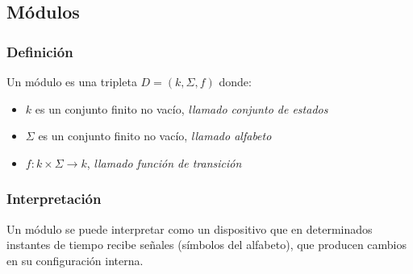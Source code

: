 \subsection{Módulos}
\subsubsection*{Definición}
Un módulo es una tripleta $D=(k,\Sigma,f)$ donde:
\begin{itemize}
\item $k$ es un conjunto finito no vacío, \textit{llamado conjunto de estados}
\item $\Sigma$ es un conjunto finito no vacío, \textit{llamado alfabeto}
\item $f:k\times\Sigma\rightarrow k$, \textit{llamado función de transición}
\end{itemize}
\subsubsection*{Interpretación}
Un módulo se puede interpretar como un dispositivo que en determinados instantes de tiempo recibe señales (símbolos del alfabeto), que producen cambios en su configuración interna.
\begin{center}
\end{center}
